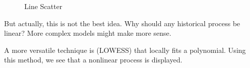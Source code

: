 \documentclass[letterpaper,10pt,english]{sphinxmanual}
\begin{document}
\begin{sphinxVerbatim}[commandchars=\\\{\}]
  
\end{sphinxVerbatim}

\noindent{}

\begin{figure}[htbp]
\centering
\capstart

\noindent{}
\caption{Line Scatter}\label{\detokenize{data-driven_music_history:id11}}\end{figure}

But actually, this is not the best idea. Why should any historical
process be linear? More complex models might make more sense.

A more versatile technique is 
(LOWESS) that locally fits a polynomial. Using this method, we see that
a non\sphinxhyphen{}linear process is displayed.
\end{document}
